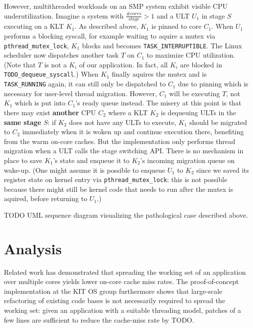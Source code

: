 \documentclass[12pt,a4paper]{book}
\begin{document}
However, multithreaded workloads on an SMP system exhibit visible CPU underutilization.
Imagine a system with $\frac{\#cores}{stage} > 1$ and a ULT $U_1$ in stage $S$ executing on a KLT $K_1$.
As described above, $K_1$ is pinned to core $C_1$.
When $U_1$ performs a blocking syscall, for example waiting to aquire a mutex via \texttt{pthread\_mutex\_lock}, $K_1$ blocks and becomes \texttt{TASK\_INTERRUPTIBLE}.
The Linux scheduler now dispatches another task $T$ on $C_1$ to maximize CPU utilization.
(Note that $T$ is not a $K_i$ of our application. In fact, all $K_i$ are blocked in \texttt{TODO\_dequeue\_syscall}.)
When $K_1$ finally aquires the mutex and is \texttt{TASK\_RUNNING} again, it can still only be dispatched to $C_1$ due to pinning which is necessary for user-level thread migration.
However, $C_1$ will be executing $T$, not $K_1$ which is put into $C_1$'s ready queue instead.
The misery at this point is that there may exist \textbf{another} CPU $C_2$ where a KLT $K_2$ is dequeuing ULTs in the \textbf{same stage} $S$:
if $K_2$ does not have any ULTs to execute, $K_1$ should be migrated to $C_2$ immediately when it is woken up and continue execution there, benefiting from the warm on-core caches.
But the implementation only performs thread migration when a ULT calls the stage switching API.
There is no mechanism in place to save $K_1$'s state and enqueue it to $K_2$'s incoming migration queue on wake-up.
(One might assume it is possible to enqueue $U_1$ to $K_2$ since we saved its register state on kernel entry via \texttt{pthread\_mutex\_lock}:
this is not possible because there might still be kernel code that needs to run after the mutex is aquired, before returning to $U_1$.)

TODO UML sequence diagram visualizing the pathological case described above.

\chapter{Analysis}\label{ch:analysis}
Related work has demonstrated that spreading the working set of an application over multiple cores yields lower on-core cache miss rates.
The proof-of-concept implementation at the KIT OS group furthermore shows that large-scale refactoring of existing code bases is not necessarily required to spread the working set:
given an application with a suitable threading model, patches of a few lines are sufficient to reduce the cache-miss rate by TODO.
\end{document}
